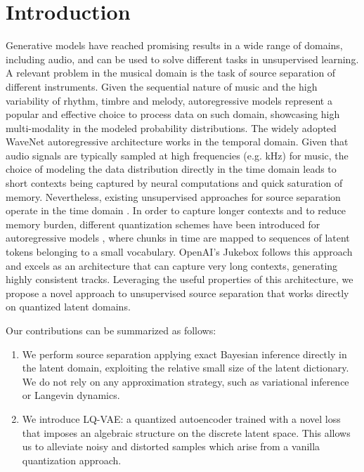 \documentclass[a4paper]{article}
\begin{document}
\section{Introduction}
\label{sec:introduction}
Generative models have reached promising results in a wide range of domains, including audio, and can be used to solve different tasks in unsupervised learning. A relevant problem in the musical domain is the task of source separation of different instruments. Given the sequential nature of music and the high variability of rhythm,  timbre and melody, autoregressive models \cite{larochelle11} represent a popular and effective choice  to process data on such domain, showcasing high multi-modality in the modeled probability distributions. The widely adopted WaveNet autoregressive architecture \cite{oord2016} works in the temporal domain. Given that audio signals are typically sampled at high frequencies (e.g.  kHz) for music, the choice of modeling the data distribution directly in the time domain leads to short contexts being captured by neural computations and quick saturation of memory. Nevertheless, existing unsupervised approaches for source separation operate in the time domain \cite{jayaram2021}. In order to capture longer contexts and to reduce memory burden, different quantization schemes have been introduced for autoregressive models \cite{oord2017,razavi2019}, where chunks in time are mapped to sequences of latent tokens belonging to a small vocabulary. OpenAI's Jukebox \cite{dhariwal:2020} follows this approach and excels as an architecture that can capture very long contexts, generating highly consistent tracks.
Leveraging the useful properties of this architecture, we propose a novel approach to unsupervised source separation that works directly on quantized latent domains. 

Our contributions can be summarized as follows:
\begin{enumerate}
    \item We perform source separation applying exact Bayesian inference directly in the latent domain, exploiting the relative small size of the latent dictionary. We do not rely on any approximation strategy, such as variational inference or Langevin dynamics. 
    \item We introduce LQ-VAE: a quantized autoencoder trained with a novel loss that  imposes an algebraic structure on the discrete latent space. This allows us to alleviate noisy and distorted samples which arise from a vanilla quantization approach.
 \end{enumerate}
\end{document}
